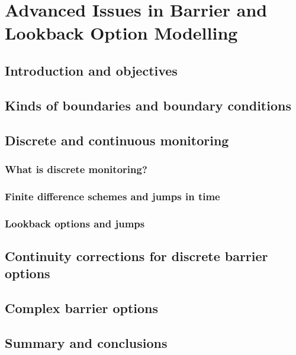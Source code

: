 \chapter{Advanced Issues in Barrier and Lookback Option Modelling}

\section{Introduction and objectives}

\section{Kinds of boundaries and boundary conditions}

\section{Discrete and continuous monitoring}

\subsection{What is discrete monitoring?}

\subsection{Finite difference schemes and jumps in time}

\subsection{Lookback options and jumps}

\section{Continuity corrections for discrete barrier options}

\section{Complex barrier options}

\section{Summary and conclusions}